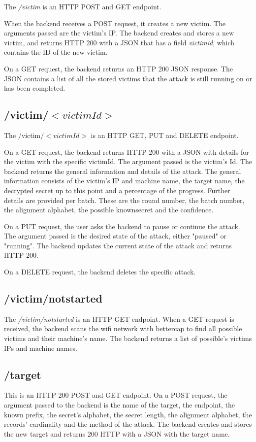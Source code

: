 The \textit{/victim} is an HTTP POST and GET endpoint. 

When the backend receives a POST request, it creates a new victim. 
The arguments passed are the victim's IP. The backend 
creates and stores a new victim, and  returns HTTP 200 with a JSON that has a 
field \textit{victimid}, which contains the ID of the new victim.


On a GET request, the backend returns an HTTP 200 JSON response. 
The JSON contains a list of all the stored victims that the attack 
is still running on or has been completed.

\subsection{/victim/$ <victimId> $}

The /victim/$ <victimId> $ is an HTTP GET, PUT and DELETE endpoint.

On a GET request, the backend returns HTTP 200 with a JSON with details 
for the victim with the specific victimId. The argument passed is the 
victim's Id. The backend returns the general information and details of 
the attack. The general information consists of the victim's IP and 
machine name, the target name, the decrypted secret up to this point 
and a percentage of the progress. Further details are provided per  batch.
These are the round number, the batch number, the alignment alphabet, 
the possible knownsecret and the confidence.

On a PUT request, the user asks the backend to pause or continue the attack. 
The argument passed is the desired state of the attack, either "paused" 
or "running". The backend updates the current state of the attack and 
returns HTTP 200. 

On a DELETE request, the backend deletes the specific attack.

\subsection{/victim/notstarted}

The \textit{/victim/notstarted} is an HTTP GET endpoint. When a GET request 
is received, the backend scans the wifi network with bettercap to find all 
possible victims and their machine's name. The backend returns a list of 
possible's victims IPs and machine names.


\subsection{/target}
This is an HTTP 200 POST and GET endpoint.
On a POST request, the argument passed to the backend is the name of the target, 
the endpoint, the known prefix, the secret's alphabet, the secret length, 
the alignment alphabet, the records' cardinality and the method of the attack. 
The backend creates and stores the new target and returns 200 HTTP with a JSON 
with the target name.

